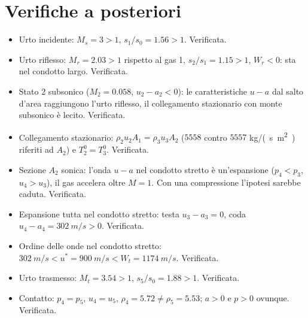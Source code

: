 \documentclass[11pt,a4paper]{article}
\newcommand{\uma}{u-a}
\newcommand{\Mr}{M_{r}}
\begin{document}
\section{Verifiche a posteriori}
\begin{itemize}
  \item Urto incidente: $M_s=3>1$, $s_1/s_0=\num{1.56}>1$. Verificata.
  \item Urto riflesso: $\Mr=\num{2.03}>1$ rispetto al gas 1, $s_2/s_1=\num{1.15}>1$, $W_r<0$: sta nel condotto
    largo. Verificata.
  \item Stato 2 subsonico ($M_2=\num{0.058}$, $u_2-a_2<0$): le caratteristiche $\uma$ dal salto d'area
    raggiungono l'urto riflesso, il collegamento stazionario con monte subsonico è lecito. Verificata.
  \item Collegamento stazionario: $\rho_2u_2A_1=\rho_3u_3A_2$ ($\num{5558}$ contro $\num{5557}$
    \si{kg/(s.m^2)} riferiti ad $A_2$) e $T^0_2=T^0_3$. Verificata.
  \item Sezione $A_2$ sonica: l'onda $\uma$ nel condotto stretto è un'espansione ($p_4<p_3$, $u_4>u_3$), il gas
    accelera oltre $M=1$. Con una compressione l'ipotesi sarebbe caduta. Verificata.
  \item Espansione tutta nel condotto stretto: testa $u_3-a_3=0$, coda $u_4-a_4=\SI{302}{m/s}>0$. Verificata.
  \item Ordine delle onde nel condotto stretto: $\SI{302}{m/s}<u^*=\SI{900}{m/s}<W_t=\SI{1174}{m/s}$. Verificata.
  \item Urto trasmesso: $M_t=\num{3.54}>1$, $s_5/s_0=\num{1.88}>1$. Verificata.
  \item Contatto: $p_4=p_5$, $u_4=u_5$, $\rho_4=\num{5.72}\ne\rho_5=\num{5.53}$; $a>0$ e $p>0$ ovunque. Verificata.
\end{itemize}

\end{document}

